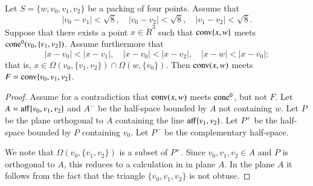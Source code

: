 \begin{tarskidata}
\begin{tarski}
\begin{lemma}
Let $S=\{w,v_0,v_1,v_2\}$ be a packing of four points.
Assume that
   $$
   |v_0-v_1| < \sqrt8,\quad |v_0-v_2| < \sqrt8,\quad |v_1-v_2| < \sqrt8.
   $$
Suppose that there exists a point $x\in\ring{R}^3$
such that 
  ${\operatorname{conv}}\{x,w\}$ meets ${\operatorname{cone}}^0(v_0,\{v_1,v_2\})$.  
Assume furthermore that
  $$
  |x-v_0| < |x-v_1|,\quad 
  |x-v_0| < |x-v_2|,\quad
  |x-w| < |x-v_0|;
  $$
that is, $x\in\Omega(v_0,\{v_1,v_2\})\cap \Omega(w,\{v_0\})$.
Then ${\operatorname{conv}}(x,w)$ meets $F={\operatorname{conv}}\{v_0,v_1,v_2\}$.
\end{lemma}


\begin{proof} 
Assume for a contradiction that ${\operatorname{conv}}(x,w)$ meets ${\operatorname{cone}}^0$,
but not $F$.  Let $A = {\operatorname{aff}}\{v_0,v_1,v_2\}$ and $A^-$
be the half-space bounded by $A$ not containing $w$. 
Let $P$
be the plane orthogonal to $A$ containing the line ${\operatorname{aff}}\{v_1,v_2\}$.
Let $P^+$ be the half-space bounded by $P$ containing $v_0$.  Let
$P^-$ be the complementary half-space.

We note that $\Omega(v_0,\{v_1,v_2\})$ is a subset of $P^+$.  Since
$v_0,v_1,v_2\in A$ and $P$ is orthogonal to $A$, this reduces to
a calculation in in plane $A$.  In the plane $A$ it follows from
the fact that the triangle $\{v_0,v_1,v_2\}$ is not obtuse.


\end{proof}
\end{tarski}
\end{tarskidata}
